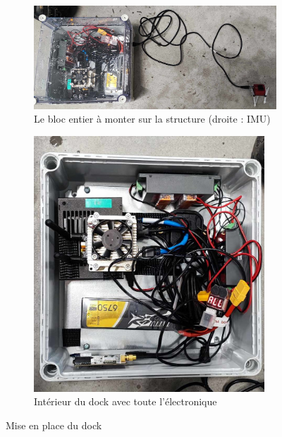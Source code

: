 \documentclass[12pt]{report}
\begin{document}
\begin{figure}[H]
    \begin{subfigure}{0.54\textwidth}
        \centering
        \includegraphics[height=\textwidth,angle=90]{imgs/dock_box_outside.jpg}
        \caption{Le bloc entier à monter sur la structure (droite : IMU)}
        \label{fig:IMU_exterieur}
    \end{subfigure}
    \begin{subfigure}{0.45\textwidth}
        \centering
        \includegraphics[width=0.95\textwidth]{imgs/dock_box_inside.jpg}
        \caption{Intérieur du dock avec toute l'électronique}
    \end{subfigure}
    \caption{Mise en place du dock}
\end{figure}
\end{document}
